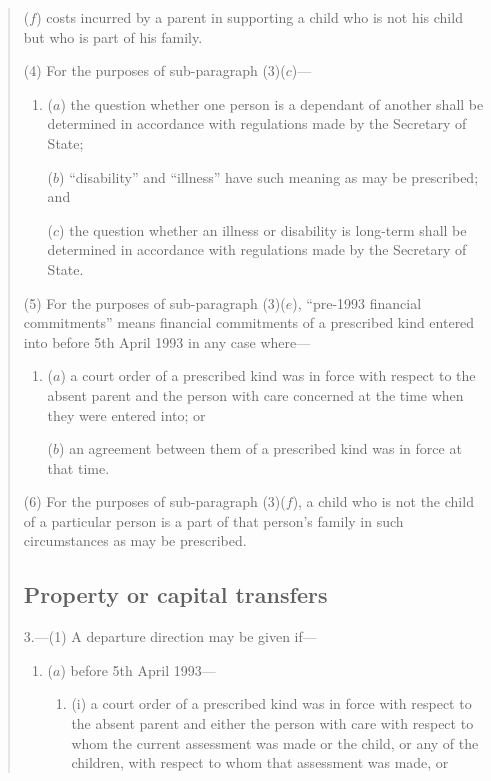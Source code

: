 \documentclass[a4paper]{article}
\begin{document}
{\begin{quotation}
\begin{enumerate}
($f$) costs incurred by a parent in supporting a child who is not his child but who is part of his family.
\end{enumerate}

(4) For the purposes of sub-paragraph (3)($c$)—
\begin{enumerate}\item[]
($a$) the question whether one person is a dependant of another shall be determined in accordance with regulations made by the Secretary of State;

($b$) “disability” and “illness” have such meaning as may be prescribed; and

($c$) the question whether an illness or disability is long-term shall be determined in accordance with regulations made by the Secretary of State.
\end{enumerate}

(5) For the purposes of sub-paragraph (3)($e$), “pre-1993 financial commitments” means financial commitments of a prescribed kind entered into before 5th April 1993 in any case where—
\begin{enumerate}\item[]
($a$) a court order of a prescribed kind was in force with respect to the absent parent and the person with care concerned at the time when they were entered into; or

($b$) an agreement between them of a prescribed kind was in force at that time.
\end{enumerate}

(6) For the purposes of sub-paragraph (3)($f$), a child who is not the child of a particular person is a part of that person’s family in such circumstances as may be prescribed.

\subsection*{Property or capital transfers}

3.---(1) A departure direction may be given if—
\begin{enumerate}\item[]
($a$) before 5th April 1993—
\begin{enumerate}\item[]
(i) a court order of a prescribed kind was in force with respect to the absent parent and either the person with care with respect to whom the current assessment was made or the child, or any of the children, with respect to whom that assessment was made, or


\end{enumerate}
\end{enumerate}
\end{quotation}}
\end{document}
